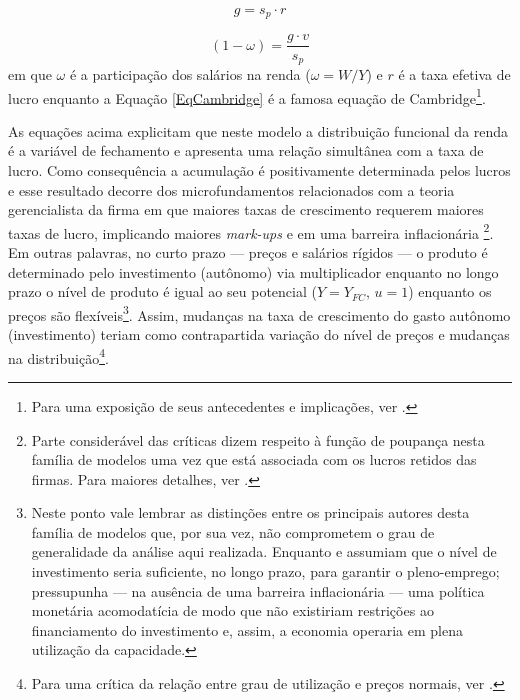 \begin{equation}
\label{EqCambridge}
g = s_p\cdot r
\end{equation}

\begin{equation}
\label{Cambridge}
(1-\omega) = \frac{g\cdot v}{s_p}
\end{equation}
em que $\omega$ é a participação dos salários na renda ($\omega = W/Y$) e $r$ é a taxa efetiva de lucro enquanto a Equação \ref{EqCambridge} é a famosa equação de Cambridge\footnote{
	Para uma exposição de seus antecedentes e implicações, ver \textcite{bortis_notes_1993}.
}.


As equações acima explicitam que neste modelo a distribuição funcional da renda é a variável de fechamento  e apresenta uma relação simultânea com a taxa de lucro. Como consequência a acumulação é positivamente determinada pelos lucros e esse resultado decorre dos microfundamentos relacionados com a teoria gerencialista da firma em que maiores taxas de crescimento requerem maiores taxas de lucro, implicando maiores \textit{mark-ups} e em uma barreira inflacionária \cite[p.~353]{lavoie_post-keynesian_2015} \footnote{Parte considerável das críticas dizem respeito à função de poupança nesta família de modelos uma vez que está associada com os lucros retidos das firmas. Para maiores detalhes, ver  \textcites[Seção III]{skott_kaldoriansaving_1981}{marglin_foundation_1984}{skott_kaldors_1989}.}. 
Em outras palavras, no curto prazo --- preços e salários rígidos --- o produto é determinado pelo investimento (autônomo) via multiplicador enquanto no longo prazo o nível de produto é igual ao seu potencial ($Y = Y_{FC}, \,u=1$) enquanto os preços são flexíveis\footnote{
	Neste ponto vale lembrar as distinções entre os principais autores desta família de modelos que, por sua vez, não comprometem o grau de generalidade da análise aqui realizada. Enquanto \textcite[5--6]{kaldor_alternative_1955} e \textcite{pasinetti_rate_1962} assumiam que o nível de investimento seria suficiente, no longo prazo, para garantir o pleno-emprego; \textcite{robinson_model_1962} pressupunha --- na ausência de uma barreira inflacionária --- uma política monetária acomodatícia de modo que não existiriam restrições ao financiamento do investimento e, assim, a economia operaria em plena utilização da capacidade.
}. Assim, mudanças na taxa de crescimento do gasto autônomo (investimento) teriam como contrapartida variação do nível de preços e mudanças na distribuição\footnote{Para uma crítica da relação entre grau de utilização e preços normais, ver \textcite{ciccone_2017}.}. 

